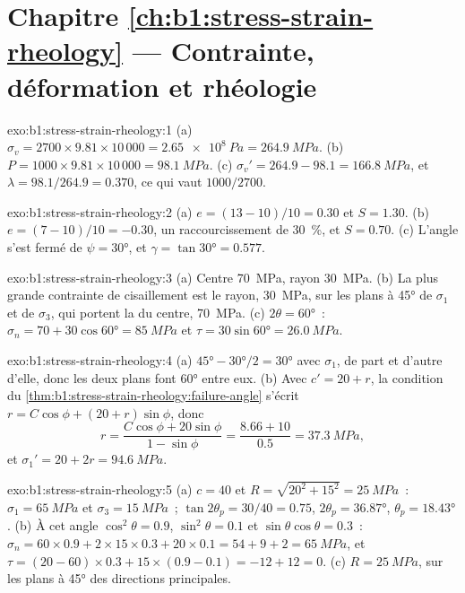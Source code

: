 \section*{Chapitre \ref{ch:b1:stress-strain-rheology} --- Contrainte, déformation et rhéologie}

\begin{solution}{exo:b1:stress-strain-rheology:1}
(a) $\sigma_v = 2700\times9.81\times10\,000 = \qty{2.65e8}{Pa} = \qty{264.9}{MPa}$.
(b) $P = 1000\times9.81\times10\,000 = \qty{98.1}{MPa}$. (c) $\sigma_v' =
264.9 - 98.1 = \qty{166.8}{MPa}$, et $\lambda = 98.1/264.9 = 0.370$, ce qui vaut
$1000/2700$.
\end{solution}

\begin{solution}{exo:b1:stress-strain-rheology:2}
(a) $e = (13-10)/10 = 0.30$ et $S = 1.30$. (b) $e = (7-10)/10 = -0.30$, un
raccourcissement de \qty{30}{\percent}, et $S = 0.70$. (c) L'angle s'est fermé de
$\psi = \ang{30}$, et $\gamma = \tan\ang{30} = 0.577$.
\end{solution}

\begin{solution}{exo:b1:stress-strain-rheology:3}
(a) Centre \qty{70}{MPa}, rayon \qty{30}{MPa}. (b) La plus grande contrainte de cisaillement
est le rayon, \qty{30}{MPa}, sur les plans à \ang{45} de $\sigma_1$ et de
$\sigma_3$, qui portent la  du centre, \qty{70}{MPa}. (c)
$2\theta = \ang{60}$~: $\sigma_n = 70 + 30\cos\ang{60} = \qty{85}{MPa}$ et
$\tau = 30\sin\ang{60} = \qty{26.0}{MPa}$.
\end{solution}

\begin{solution}{exo:b1:stress-strain-rheology:4}
(a) $\ang{45} - \ang{30}/2 = \ang{30}$ avec $\sigma_1$, de part et d'autre d'elle,
donc les deux plans font \ang{60} entre eux. (b) Avec $c' = 20 + r$, la
condition du \cref{thm:b1:stress-strain-rheology:failure-angle} s'écrit
$r = C\cos\phi + (20 + r)\sin\phi$, donc
\[
  r = \frac{C\cos\phi + 20\sin\phi}{1 - \sin\phi} = \frac{8.66 + 10}{0.5}
    = \qty{37.3}{MPa},
\]
et $\sigma_1' = 20 + 2r = \qty{94.6}{MPa}$.
\end{solution}

\begin{solution}{exo:b1:stress-strain-rheology:5}
(a) $c = 40$ et $R = \sqrt{20^2 + 15^2} = \qty{25}{MPa}$~: $\sigma_1 =
\qty{65}{MPa}$ et $\sigma_3 = \qty{15}{MPa}$~; $\tan2\theta_p = 30/40 = 0.75$,
$2\theta_p = \ang{36.87}$, $\theta_p = \ang{18.43}$. (b) À cet angle
$\cos^2\theta = 0.9$, $\sin^2\theta = 0.1$ et $\sin\theta\cos\theta = 0.3$~:
$\sigma_n = 60\times0.9 + 2\times15\times0.3 + 20\times0.1 = 54 + 9 + 2 =
\qty{65}{MPa}$, et $\tau = (20-60)\times0.3 + 15\times(0.9-0.1) = -12 + 12 =
0$. (c) $R = \qty{25}{MPa}$, sur les plans à \ang{45} des directions
principales.
\end{solution}

